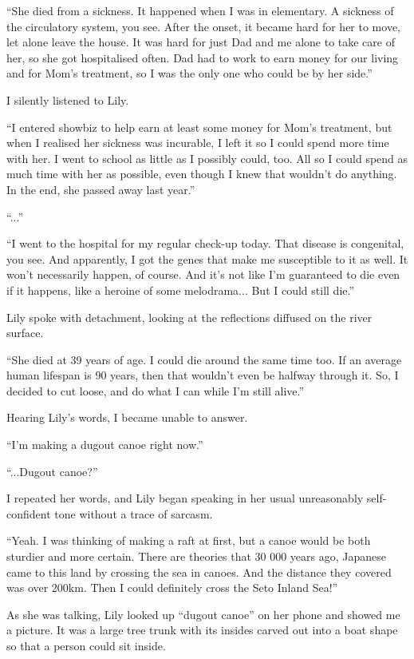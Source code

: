 ``She died from a sickness. It happened when I was in elementary. A sickness of the circulatory system, you see. After the onset, it became hard for her to move, let alone leave the house. It was hard for just Dad and me alone to take care of her, so she got hospitalised often. Dad had to work to earn money for our living and for Mom's treatment, so I was the only one who could be by her side.''

I silently listened to Lily.

``I entered showbiz to help earn at least some money for Mom's treatment, but when I realised her sickness was incurable, I left it so I could spend more time with her. I went to school as little as I possibly could, too. All so I could spend as much time with her as possible, even though I knew that wouldn't do anything. In the end, she passed away last year.''

``...''

``I went to the hospital for my regular check-up today. That disease is congenital, you see. And apparently, I got the genes that make me susceptible to it as well. It won't necessarily happen, of course. And it's not like I'm guaranteed to die even if it happens, like a heroine of some melodrama... But I could still die.''

Lily spoke with detachment, looking at the reflections diffused on the river surface.

``She died at 39 years of age. I could die around the same time too. If an average human lifespan is 90 years, then that wouldn't even be halfway through it. So, I decided to cut loose, and do what I can while I'm still alive.''

Hearing Lily's words, I became unable to answer.

``I'm making a dugout canoe right now.''

``...Dugout canoe?''

I repeated her words, and Lily began speaking in her usual unreasonably self-confident tone without a trace of sarcasm.

``Yeah. I was thinking of making a raft at first, but a canoe would be both sturdier and more certain. There are theories that 30 000 years ago, Japanese came to this land by crossing the sea in canoes. And the distance they covered was over 200km. Then I could definitely cross the Seto Inland Sea!''

As she was talking, Lily looked up ``dugout canoe'' on her phone and showed me a picture. It was a large tree trunk with its insides carved out into a boat shape so that a person could sit inside.

